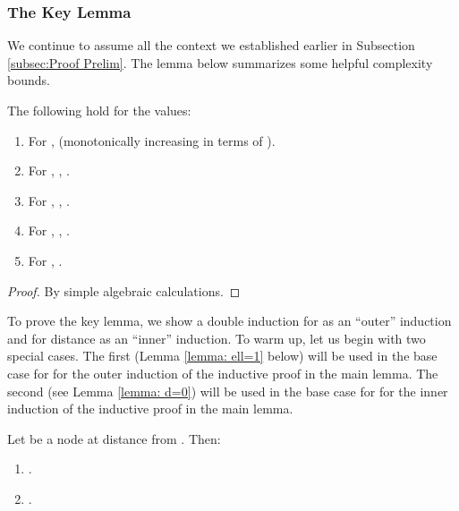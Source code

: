 \subsubsection{The Key Lemma}
\label{subsec: The Key Lemma}

We continue to assume all the context we established earlier in Subsection \ref{subsec:Proof Prelim}.
The lemma below summarizes some helpful complexity bounds.

\begin{lemma}
\label{lemma:bmmb: t d ell values}
\label{lemma: t-inequalities}
The following hold for the  values:
  \begin{enumerate}
  \item For ,  (monotonically increasing in terms of ).
  \label{item:lemma: t dl monotonically increasing}



  \item For , , .
  \label{item:lemma com-bounds r fack}

  \item For , , .
  \label{item:lemma com-bounds fack t d+r ell-1 + Fack leq t d-1 ell}


  \item For , , .
  \label{item:lemma com-bounds fprog}

  \item For , .
  \label{item:t- t0 + ell fack leq t 0 ell}


  \end{enumerate}
\end{lemma}


\begin{proof}
By simple algebraic calculations.
\end{proof}


To prove the key lemma, we show a double induction
for  as an ``outer'' induction and for distance  as an ``inner'' induction.
To warm up, let us begin with two special cases.
The first (Lemma \ref{lemma: ell=1} below) will be used in the base case for  for the outer induction of the inductive proof
in the main lemma.
The second (see Lemma \ref{lemma: d=0}) will be used in the base case for  for the inner induction of the inductive proof
in the main lemma.


\begin{lemma}
\label{lemma: ell=1}
Let  be a node at distance  from .
Then:
\begin{enumerate}
\item
.
\item
.
\end{enumerate}
\end{lemma}

